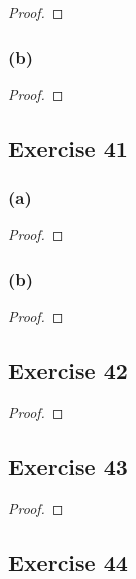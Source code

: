\documentclass[14pt]{extarticle}
\begin{document}
\begin{proof}

\end{proof}

\subsubsection{(b)}

\begin{proof}

\end{proof}

\subsection{Exercise 41}

\subsubsection{(a)}

\begin{proof}

\end{proof}

\subsubsection{(b)}

\begin{proof}

\end{proof}

\subsection{Exercise 42}

\begin{proof}

\end{proof}

\subsection{Exercise 43}

\begin{proof}

\end{proof}

\subsection{Exercise 44}
\end{document}
